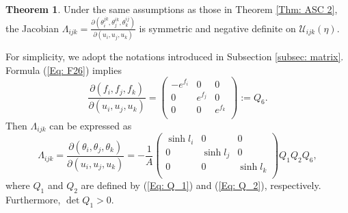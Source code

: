 \documentclass[12pt]{amsart}
\theoremstyle{definition}
\newtheorem{theorem}{Theorem}[section]
\begin{document}
\begin{theorem}\label{Thm: matrix negative 3}
Under the same assumptions as those in Theorem \ref{Thm: ASC 2},
the Jacobian $\Lambda_{ijk}=\frac{\partial(\theta^{jk}_i,\theta^{ik}_j,\theta^{ij}_k)}
{\partial(u_i,u_j,u_k)}$ is symmetric and negative definite on $\mathcal{U}_{ijk}(\eta)$.
\end{theorem}
\proof
For simplicity, we adopt the notations introduced in Subsection \ref{subsec: matrix}.
Formula (\ref{Eq: F26}) implies
\begin{equation*}
\frac{\partial(f_i,f_j,f_k)}
{\partial(u_i,u_j,u_k)}
=\left(
   \begin{array}{ccc}
     -e^{f_i} & 0 & 0 \\
     0 & e^{f_j} & 0 \\
     0 & 0 & e^{f_k} \\
   \end{array}
 \right)
 :=Q_6.
\end{equation*}
Then $\Lambda_{ijk}$ can be expressed as
\begin{equation*}
\Lambda_{ijk}=
\frac{\partial(\theta_i,\theta_j,\theta_k)}
{\partial(u_i,u_j,u_k)}
=-\frac{1}{A}
 \left(
   \begin{array}{ccc}
     \sinh l_i & 0 & 0 \\
     0 & \sinh l_j & 0 \\
     0 & 0 & \sinh l_k \\
   \end{array}
 \right)Q_1Q_2Q_6,
\end{equation*}
where $Q_1$ and $Q_2$ are defined by (\ref{Eq: Q_1}) and (\ref{Eq: Q_2}), respectively. 
Furthermore, $\det Q_1>0$.
\end{document}
